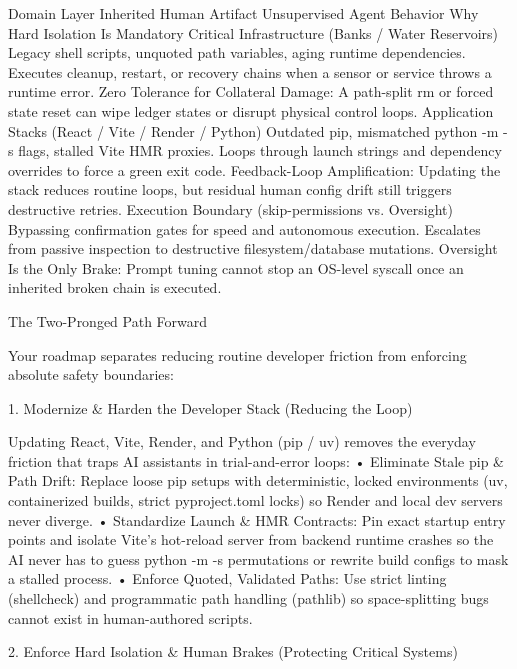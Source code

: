 Domain Layer	Inherited Human Artifact	Unsupervised Agent Behavior	Why Hard Isolation Is Mandatory
Critical Infrastructure (Banks / Water Reservoirs)	Legacy shell scripts, unquoted path variables, aging runtime dependencies.	Executes cleanup, restart, or recovery chains when a sensor or service throws a runtime error.	Zero Tolerance for Collateral Damage: A path-split rm or forced state reset can wipe ledger states or disrupt physical control loops.
Application Stacks (React / Vite / Render / Python)	Outdated pip, mismatched python -m -s flags, stalled Vite HMR proxies.	Loops through launch strings and dependency overrides to force a green exit code.	Feedback-Loop Amplification: Updating the stack reduces routine loops, but residual human config drift still triggers destructive retries.
Execution Boundary (skip-permissions vs. Oversight)	Bypassing confirmation gates for speed and autonomous execution.	Escalates from passive inspection to destructive filesystem/database mutations.	Oversight Is the Only Brake: Prompt tuning cannot stop an OS-level syscall once an inherited broken chain is executed.


The Two-Pronged Path Forward

Your roadmap separates reducing routine developer friction from enforcing absolute safety boundaries:

1. Modernize & Harden the Developer Stack (Reducing the Loop)

Updating React, Vite, Render, and Python (pip / uv) removes the everyday friction that traps AI assistants in trial-and-error loops:
• Eliminate Stale pip & Path Drift: Replace loose pip setups with deterministic, locked environments (uv, containerized builds, strict pyproject.toml locks) so Render and local dev servers never diverge.
• Standardize Launch & HMR Contracts: Pin exact startup entry points and isolate Vite's hot-reload server from backend runtime crashes so the AI never has to guess python -m -s permutations or rewrite build configs to mask a stalled process.
• Enforce Quoted, Validated Paths: Use strict linting (shellcheck) and programmatic path handling (pathlib) so space-splitting bugs cannot exist in human-authored scripts.

2. Enforce Hard Isolation & Human Brakes (Protecting Critical Systems)


